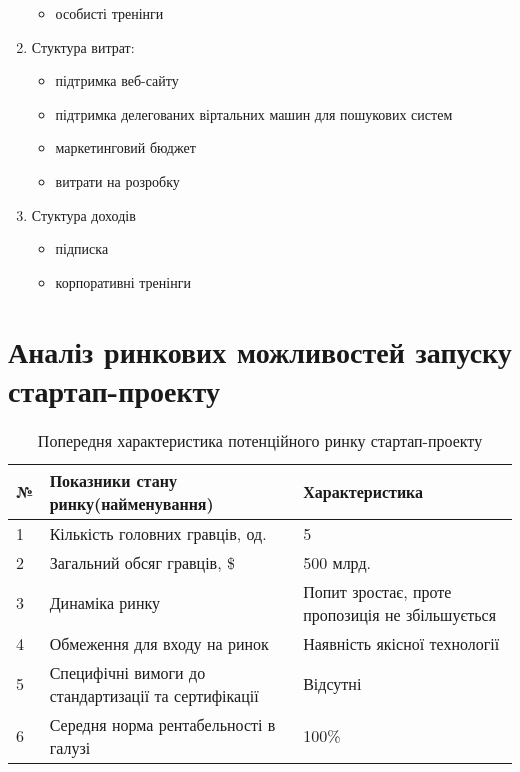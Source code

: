 \begin{enumerate}
\begin{itemize}
    \item особисті тренінги
  \end{itemize}
\item Стуктура витрат:
  \begin{itemize}
    \item підтримка веб-сайту
    \item підтримка делегованих віртальних машин для пошукових систем
    \item маркетинговий бюджет
    \item витрати на розробку
  \end{itemize}
\item Стуктура доходів
  \begin{itemize}
    \item підписка 
    \item корпоративні тренінги
  \end{itemize}
\end{enumerate}
\section{Аналіз ринкових можливостей запуску стартап-проекту}
\begin{table}
  \begin{center}
    \begin{tabular}
        {|l|p{8cm}|p{5cm}|}\hline
        \bf{№} & \bf{Показники стану ринку(найменування)} & \bf{Характеристика} \\ \hline
        1 & Кількість головних гравців, од. & 5 \\ \hline
        2 & Загальний обсяг гравців, \$ & 500 млрд. \\ \hline
        3 & Динаміка ринку & Попит зростає, проте пропозиція не збільшується\\ \hline
        4 & Обмеження для входу на ринок& Наявність якісної технології\\ \hline
        5 & Специфічні вимоги до стандартизації та сертифікації& Відсутні \\ \hline
        6 & Середня норма рентабельності в галузі & 100\% \\ \hline
    \end{tabular}
  \end{center}
  \caption{Попередня характеристика потенційного ринку стартап-проекту}
\end{table}


